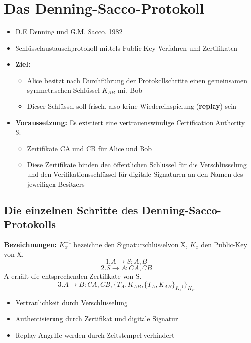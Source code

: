 \documentclass[openany]{book}
\begin{document}
\section{Das Denning-Sacco-Protokoll}

\begin{itemize}
    \item D.E Denning und G.M. Sacco, 1982
    \item Schlüsselaustauschprotokoll mittels Public-Key-Verfahren und Zertifikaten
    \item \textbf{Ziel:}
    \begin{itemize}
        \item Alice besitzt nach Durchführung der Protokollschritte einen gemeinsamen symmetrischen Schlüssel $K_{AB}$ mit Bob
        \item Dieser Schlüssel soll frisch, also keine Wiedereinspielung (\textbf{replay}) sein
    \end{itemize}
    \item \textbf{Voraussetzung:} Es existiert eine vertrauenswürdige Certification Authority S:
    \begin{itemize}
        \item Zertifikate CA und CB für Alice und Bob
        \item Diese Zertifikate binden den öffentlichen Schlüssel für die Verschlüsselung und den Verifikationsschlüssel für digitale Signaturen an den Namen des jeweiligen Besitzers
    \end{itemize}
\end{itemize}

\subsection{Die einzelnen Schritte des Denning-Sacco-Protokolls}

\textbf{Bezeichnungen:} $K_x^{-1}$ bezeichne den Signaturschlüsselvon X, $K_x$ den Public-Key von X. $$1. A\rightarrow S:A,B$$ $$2. S\rightarrow A: CA,CB$$ A erhält die entsprechenden Zertifikate von S. $$3. A\rightarrow B:CA,CB,\{ T_A,K_{AB},\{ T_A,K_{AB}\} _{K_{A}^{-1}}\} _{K_B}$$ 

\begin{itemize}
    \item Vertraulichkeit durch Verschlüsselung
    \item Authentisierung durch Zertifikat und digitale Signatur
    \item Replay-Angriffe werden durch Zeitstempel verhindert
\end{itemize}
\end{document}
